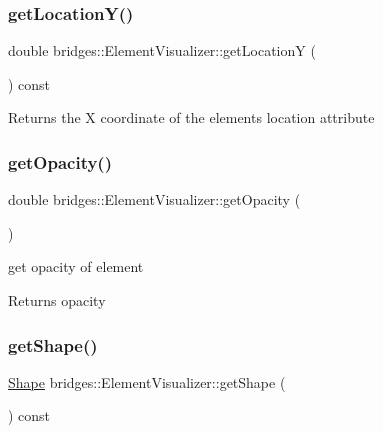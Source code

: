 \subsubsection{\texorpdfstring{get\+Location\+Y()}{getLocationY()}}
{\footnotesize\ttfamily double bridges\+::\+Element\+Visualizer\+::get\+LocationY (\begin{DoxyParamCaption}{ }\end{DoxyParamCaption}) const\hspace{0.3cm}{\ttfamily [inline]}}

\begin{DoxyReturn}{Returns}
the X coordinate of the element\textquotesingle{}s location attribute 
\end{DoxyReturn}
\mbox{\label{classbridges_1_1_element_visualizer_ae806977ebc8ff1c5bce81c90b31902b5}} 
\subsubsection{\texorpdfstring{get\+Opacity()}{getOpacity()}}
{\footnotesize\ttfamily double bridges\+::\+Element\+Visualizer\+::get\+Opacity (\begin{DoxyParamCaption}{ }\end{DoxyParamCaption})\hspace{0.3cm}{\ttfamily [inline]}}

get opacity of element

\begin{DoxyReturn}{Returns}
opacity 
\end{DoxyReturn}
\mbox{\label{classbridges_1_1_element_visualizer_a2348ed705c5c6f85082e2aff11d439e7}} 
\subsubsection{\texorpdfstring{get\+Shape()}{getShape()}}
{\footnotesize\ttfamily \mbox{\hyperlink{namespacebridges_a1b4050586bd708782ae0d4f3b06b9579}{Shape}} bridges\+::\+Element\+Visualizer\+::get\+Shape (\begin{DoxyParamCaption}{ }\end{DoxyParamCaption}) const\hspace{0.3cm}{\ttfamily [inline]}}

